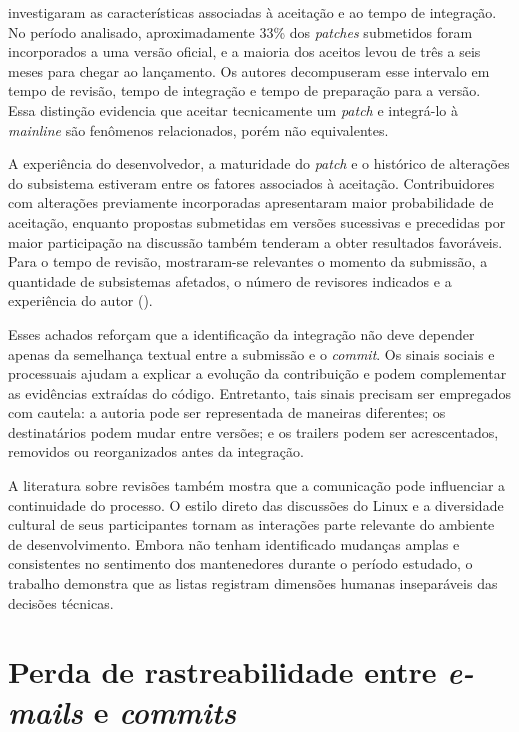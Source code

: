 \cite{jiang2013patch} investigaram as características associadas à aceitação e ao tempo de integração. No período analisado, aproximadamente 33\% dos \textit{patches} submetidos foram incorporados a uma versão oficial, e a maioria dos aceitos levou de três a seis meses para chegar ao lançamento. Os autores decompuseram esse intervalo em tempo de revisão, tempo de integração e tempo de preparação para a versão. Essa distinção evidencia que aceitar tecnicamente um \textit{patch} e integrá-lo à \textit{mainline} são fenômenos relacionados, porém não equivalentes. 

A experiência do desenvolvedor, a maturidade do \textit{patch} e o histórico de alterações do subsistema estiveram entre os fatores associados à aceitação. Contribuidores com alterações previamente incorporadas apresentaram maior probabilidade de aceitação, enquanto propostas submetidas em versões sucessivas e precedidas por maior participação na discussão também tenderam a obter resultados favoráveis. Para o tempo de revisão, mostraram-se relevantes o momento da submissão, a quantidade de subsistemas afetados, o número de revisores indicados e a experiência do autor (\cite{jiang2013patch}). 

Esses achados reforçam que a identificação da integração não deve depender apenas da semelhança textual entre a submissão e o \textit{commit}. Os sinais sociais e processuais ajudam a explicar a evolução da contribuição e podem complementar as evidências extraídas do código. Entretanto, tais sinais precisam ser empregados com cautela: a autoria pode ser representada de maneiras diferentes; os destinatários podem mudar entre versões; e os trailers podem ser acrescentados, removidos ou reorganizados antes da integração.

A literatura sobre revisões também mostra que a comunicação pode influenciar a continuidade do processo. O estilo direto das discussões do Linux e a diversidade cultural de seus participantes tornam as interações parte relevante do ambiente de desenvolvimento. Embora \cite{ferreira2019maintainers} não tenham identificado mudanças amplas e consistentes no sentimento dos mantenedores durante o período estudado, o trabalho demonstra que as listas registram dimensões humanas inseparáveis das decisões técnicas.


\section{Perda de rastreabilidade entre \textit{e-mails} e \textit{commits}}

